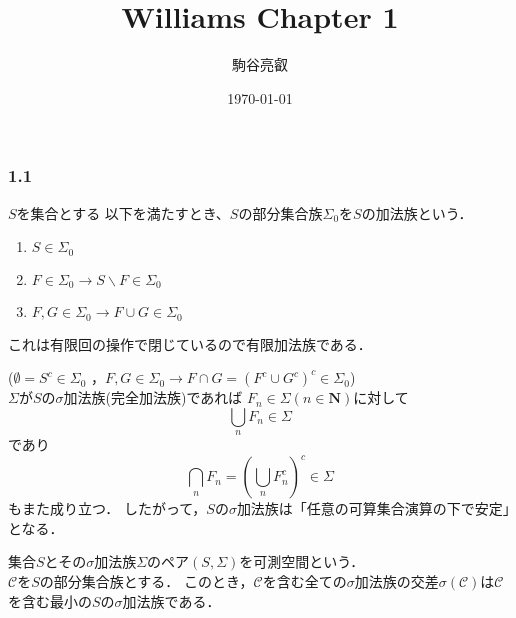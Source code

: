 \documentclass{jsarticle}
\title{Williams Chapter 1}
\author{駒谷亮叡}
\date{\today}
\begin{document}
\maketitle

\subsubsection*{1.1}

$S$を集合とする
以下を満たすとき、$S$の部分集合族$\Sigma_0$を$S$の加法族という．
\begin{enumerate}
    \item $S\in\Sigma_0$
    \item $F\in\Sigma_0 \rightarrow S\backslash F\in\Sigma_0$
    \item $F,G\in\Sigma_0 \rightarrow F\cup G\in\Sigma_0$
\end{enumerate}

これは有限回の操作で閉じているので有限加法族である．

($\emptyset=S^c\in\Sigma_0$
，$F,G\in\Sigma_0 \rightarrow F\cap G=(F^c\cup G^c)^c\in\Sigma_0$)
\\

$\Sigma$が$S$の$\sigma$加法族(完全加法族)であれば
$F_n\in\Sigma(n\in\mathbf{N})$に対して
\begin{equation}
    \bigcup_{n} F_n\in\Sigma \nonumber
\end{equation}
であり
\begin{equation}
    \bigcap_{n} F_n = \left(\bigcup_{n} F_n^c\right)^c \in\Sigma  \nonumber
\end{equation}
もまた成り立つ．
したがって，$S$の$\sigma$加法族は「任意の可算集合演算の下で安定」となる．

集合$S$とその$\sigma$加法族$\Sigma$のペア$(S,\Sigma)$を可測空間という．
\\

$\mathcal{C}$を$S$の部分集合族とする．
このとき，$\mathcal{C}$を含む全ての$\sigma$加法族の交差$\sigma(\mathcal{C})$は$\mathcal{C}$を含む最小の$S$の$\sigma$加法族である．
\end{document}
